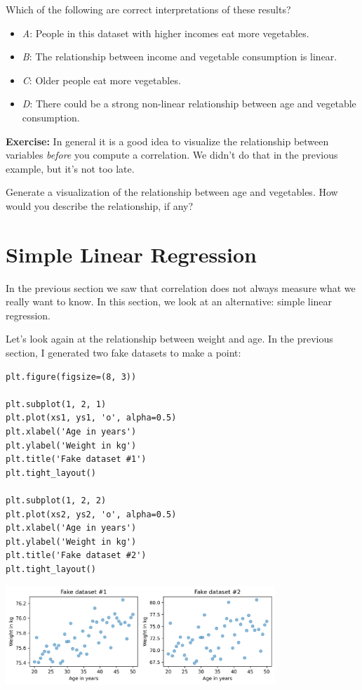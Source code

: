 Which of the following are correct interpretations of these results?

\begin{itemize}

\item
  \emph{A}: People in this dataset with higher incomes eat more
  vegetables.
\item
  \emph{B}: The relationship between income and vegetable consumption is
  linear.
\item
  \emph{C}: Older people eat more vegetables.
\item
  \emph{D}: There could be a strong non-linear relationship between age
  and vegetable consumption.
\end{itemize}

\textbf{Exercise:} In general it is a good idea to visualize the
relationship between variables \emph{before} you compute a correlation.
We didn't do that in the previous example, but it's not too late.

Generate a visualization of the relationship between age and vegetables.
How would you describe the relationship, if any?

\hypertarget{simple-linear-regression}{%
\section{Simple Linear Regression}\label{simple-linear-regression}}

In the previous section we saw that correlation does not always measure
what we really want to know. In this section, we look at an alternative:
simple linear regression.

Let's look again at the relationship between weight and age. In the
previous section, I generated two fake datasets to make a point:

\begin{lstlisting}[]
plt.figure(figsize=(8, 3))

plt.subplot(1, 2, 1)
plt.plot(xs1, ys1, 'o', alpha=0.5)
plt.xlabel('Age in years')
plt.ylabel('Weight in kg')
plt.title('Fake dataset #1')
plt.tight_layout()

plt.subplot(1, 2, 2)
plt.plot(xs2, ys2, 'o', alpha=0.5)
plt.xlabel('Age in years')
plt.ylabel('Weight in kg')
plt.title('Fake dataset #2')
plt.tight_layout()
\end{lstlisting}

\begin{center}
\includegraphics[width=4in]{chapters/09_relationships_files/09_relationships_77_0.png}
\end{center}

